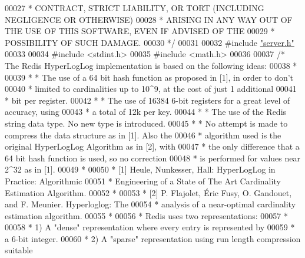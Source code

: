 \begin{DoxyCode}
00027 \textcolor{comment}{ * CONTRACT, STRICT LIABILITY, OR TORT (INCLUDING NEGLIGENCE OR OTHERWISE)}
00028 \textcolor{comment}{ * ARISING IN ANY WAY OUT OF THE USE OF THIS SOFTWARE, EVEN IF ADVISED OF THE}
00029 \textcolor{comment}{ * POSSIBILITY OF SUCH DAMAGE.}
00030 \textcolor{comment}{ */}
00031 
00032 \textcolor{preprocessor}{#}\textcolor{preprocessor}{include} \hyperlink{server_8h}{"server.h"}
00033 
00034 \textcolor{preprocessor}{#}\textcolor{preprocessor}{include} \textcolor{preprocessor}{<}\textcolor{preprocessor}{stdint}\textcolor{preprocessor}{.}\textcolor{preprocessor}{h}\textcolor{preprocessor}{>}
00035 \textcolor{preprocessor}{#}\textcolor{preprocessor}{include} \textcolor{preprocessor}{<}\textcolor{preprocessor}{math}\textcolor{preprocessor}{.}\textcolor{preprocessor}{h}\textcolor{preprocessor}{>}
00036 
00037 \textcolor{comment}{/* The Redis HyperLogLog implementation is based on the following ideas:}
00038 \textcolor{comment}{ *}
00039 \textcolor{comment}{ * * The use of a 64 bit hash function as proposed in [1], in order to don't}
00040 \textcolor{comment}{ *   limited to cardinalities up to 10^9, at the cost of just 1 additional}
00041 \textcolor{comment}{ *   bit per register.}
00042 \textcolor{comment}{ * * The use of 16384 6-bit registers for a great level of accuracy, using}
00043 \textcolor{comment}{ *   a total of 12k per key.}
00044 \textcolor{comment}{ * * The use of the Redis string data type. No new type is introduced.}
00045 \textcolor{comment}{ * * No attempt is made to compress the data structure as in [1]. Also the}
00046 \textcolor{comment}{ *   algorithm used is the original HyperLogLog Algorithm as in [2], with}
00047 \textcolor{comment}{ *   the only difference that a 64 bit hash function is used, so no correction}
00048 \textcolor{comment}{ *   is performed for values near 2^32 as in [1].}
00049 \textcolor{comment}{ *}
00050 \textcolor{comment}{ * [1] Heule, Nunkesser, Hall: HyperLogLog in Practice: Algorithmic}
00051 \textcolor{comment}{ *     Engineering of a State of The Art Cardinality Estimation Algorithm.}
00052 \textcolor{comment}{ *}
00053 \textcolor{comment}{ * [2] P. Flajolet, Éric Fusy, O. Gandouet, and F. Meunier. Hyperloglog: The}
00054 \textcolor{comment}{ *     analysis of a near-optimal cardinality estimation algorithm.}
00055 \textcolor{comment}{ *}
00056 \textcolor{comment}{ * Redis uses two representations:}
00057 \textcolor{comment}{ *}
00058 \textcolor{comment}{ * 1) A "dense" representation where every entry is represented by}
00059 \textcolor{comment}{ *    a 6-bit integer.}
00060 \textcolor{comment}{ * 2) A "sparse" representation using run length compression suitable}

\end{DoxyCode}
